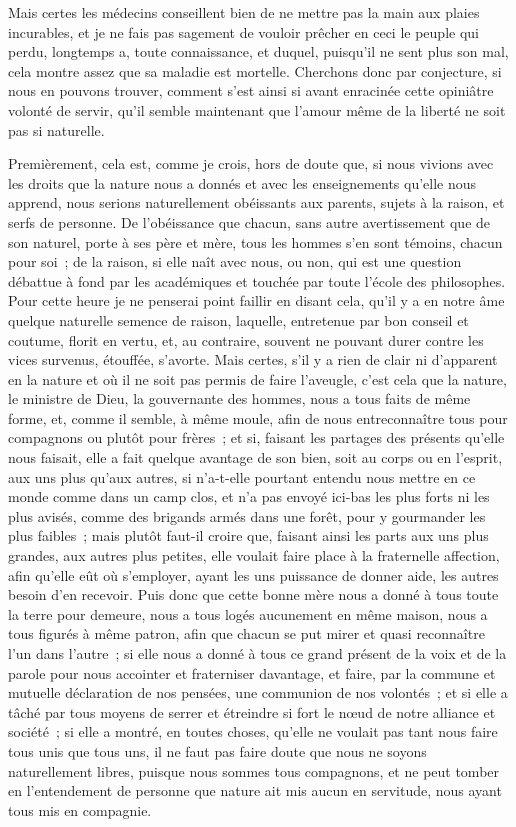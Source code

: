 \documentclass[french,twoside]{book} %
\begin{document}
Mais certes les médecins conseillent bien de ne mettre pas la main aux plaies incurables, et je ne fais pas sagement de vouloir prêcher en ceci le peuple qui perdu, longtemps a, toute connaissance, et duquel, puisqu’il ne sent plus son mal, cela montre assez que sa maladie est mortelle. Cherchons donc par conjecture, si nous en pouvons trouver, comment s’est ainsi si avant enracinée cette opiniâtre volonté de servir, qu’il semble maintenant que l’amour même de la liberté ne soit pas si naturelle.\par
Premièrement, cela est, comme je crois, hors de doute que, si nous vivions avec les droits que la nature nous a donnés et avec les enseignements qu’elle nous apprend, nous serions naturellement obéissants aux parents, sujets à la raison, et serfs de personne. De l’obéissance que chacun, sans autre avertissement que de son naturel, porte à ses père et mère, tous les hommes s’en sont témoins, chacun pour soi ; de la raison, si elle naît avec nous, ou non, qui est une question débattue à fond par les académiques et touchée par toute l’école des philosophes. Pour cette heure je ne penserai point faillir en disant cela, qu’il y a en notre âme quelque naturelle semence de raison, laquelle, entretenue par bon conseil et coutume, florit en vertu, et, au contraire, souvent ne pouvant durer contre les vices survenus, étouffée, s’avorte. Mais certes, s’il y a rien de clair ni d’apparent en la nature et où il ne soit pas permis de faire l’aveugle, c’est cela que la nature, le ministre de Dieu, la gouvernante des hommes, nous a tous faits de même forme, et, comme il semble, à même moule, afin de nous entreconnaître tous pour compagnons ou plutôt pour frères ; et si, faisant les partages des présents qu’elle nous faisait, elle a fait quelque avantage de son bien, soit au corps ou en l’esprit, aux uns plus qu’aux autres, si n’a-t-elle pourtant entendu nous mettre en ce monde comme dans un camp clos, et n’a pas envoyé ici-bas les plus forts ni les plus avisés, comme des brigands armés dans une forêt, pour y gourmander les plus faibles ; mais plutôt faut-il croire que, faisant ainsi les parts aux uns plus grandes, aux autres plus petites, elle voulait faire place à la fraternelle affection, afin qu’elle eût où s’employer, ayant les uns puissance de donner aide, les autres besoin d’en recevoir. Puis donc que cette bonne mère nous a donné à tous toute la terre pour demeure, nous a tous logés aucunement en même maison, nous a tous figurés à même patron, afin que chacun se put mirer et quasi reconnaître l’un dans l’autre ; si elle nous a donné à tous ce grand présent de la voix et de la parole pour nous accointer et fraterniser davantage, et faire, par la commune et mutuelle déclaration de nos pensées, une communion de nos volontés ; et si elle a tâché par tous moyens de serrer et étreindre si fort le nœud de notre alliance et société ; si elle a montré, en toutes choses, qu’elle ne voulait pas tant nous faire tous unis que tous uns, il ne faut pas faire doute que nous ne soyons naturellement libres, puisque nous sommes tous compagnons, et ne peut tomber en l’entendement de personne que nature ait mis aucun en servitude, nous ayant tous mis en compagnie.\par
\end{document}
